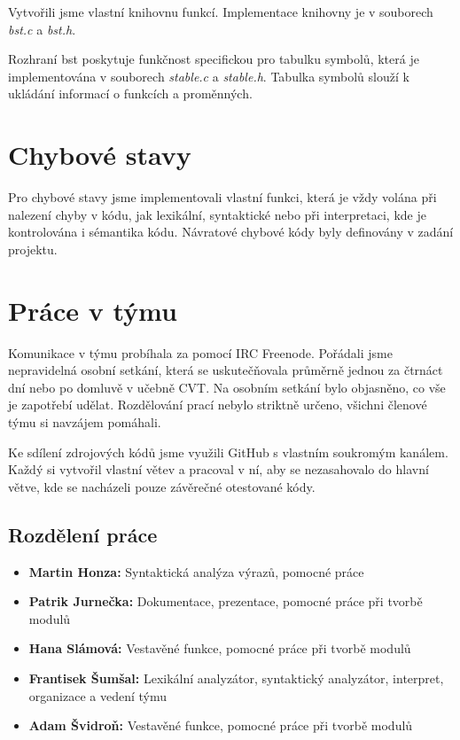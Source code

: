 \documentclass[a4paper, 11pt, titlepage]{article}
\begin{document}
Vytvořili jsme vlastní knihovnu funkcí. Implementace knihovny je v souborech \textit{bst.c} a \textit{bst.h}. 

Rozhraní bst poskytuje funkčnost specifickou pro tabulku symbolů, která je implementována v souborech \textit{stable.c} a \textit{stable.h}. Tabulka symbolů slouží k ukládání informací o funkcích a proměnných.

\section{Chybové stavy}
Pro chybové stavy jsme implementovali vlastní funkci, která je vždy volána při nalezení chyby v kódu, jak lexikální, syntaktické nebo při interpretaci, kde je kontrolována i sémantika kódu. Návratové chybové kódy byly definovány v zadání projektu. 
 

\newpage

\section{Práce v týmu}
Komunikace v týmu probíhala za pomocí IRC Freenode. Pořádali jsme nepravidelná osobní setkání, která se uskutečňovala průměrně jednou za čtrnáct dní nebo po domluvě v učebně CVT. Na osobním setkání bylo objasněno, co vše je zapotřebí udělat. Rozdělování prací nebylo striktně určeno, všichni členové týmu si navzájem pomáhali.    

Ke sdílení zdrojových kódů jsme využili GitHub s vlastním soukromým kanálem. Každý si vytvořil vlastní větev a pracoval v ní, aby se nezasahovalo do hlavní větve, kde se nacházeli pouze závěrečné otestované kódy.  

\subsection{Rozdělení práce}

\begin{itemize}
	\item\textbf{Martin Honza:} Syntaktická analýza výrazů, pomocné práce
	\item\textbf{Patrik Jurnečka:} Dokumentace, prezentace, pomocné práce při tvorbě modulů
	\item\textbf{Hana Slámová:} Vestavěné funkce, pomocné práce při tvorbě modulů
	\item\textbf{Frantisek Šumšal:} Lexikální analyzátor, syntaktický analyzátor, interpret, organizace a vedení týmu
	\item\textbf{Adam Švidroň:} Vestavěné funkce, pomocné práce při tvorbě modulů
\end{itemize}  
\end{document}
